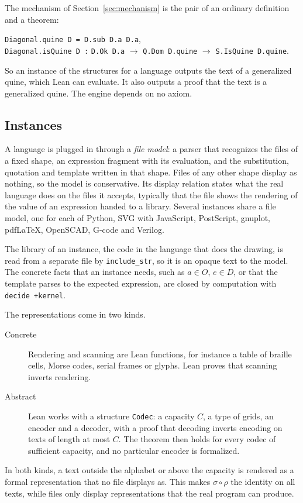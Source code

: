 \documentclass[11pt]{amsart}
\theoremstyle{definition}
\theoremstyle{remark}
\newcommand{\rend}{\rho}
\newcommand{\scan}{\sigma}
\newcommand{\lean}[1]{\texttt{#1}}
\begin{document}
The mechanism of Section~\ref{sec:mechanism} is the pair of an ordinary definition and a theorem:
\begin{center}\small
\lean{Diagonal.quine D = D.sub D.a D.a},\\
\lean{Diagonal.isQuine D :} \lean{D.Ok D.a} $\to$ \lean{Q.Dom D.quine} $\to$
\lean{S.IsQuine D.quine}.
\end{center}
So an instance of the structures for a language outputs the text of a generalized quine, which
Lean can evaluate. It also outputs a proof that the text is a generalized quine. The engine depends
on no axiom.

\subsection{Instances}

A language is plugged in through a \emph{file model}: a parser that recognizes the files of a fixed
shape, an expression fragment with its evaluation, and the substitution, quotation and template
written in that shape. Files of any other shape display as nothing, so the model is conservative.
Its display relation states what the real language does on the files it accepts, typically that the
file shows the rendering of the value of an expression handed to a library. Several instances share
a file model, one for each of Python, SVG with JavaScript, PostScript, gnuplot, pdf\LaTeX, OpenSCAD,
G-code and Verilog.

The library of an instance, the code in the language that does the drawing, is read from a separate
file by \lean{include\_str}, so it is an opaque text to the model. The concrete facts that an
instance needs, such as $a \in O$, $e \in D$, or that the template parses to the expected
expression, are closed by computation with \lean{decide +kernel}.

The representations come in two kinds.
\begin{description}
\item[Concrete] Rendering and scanning are Lean functions, for instance a table of braille cells,
Morse codes, serial frames or glyphs. Lean proves
that scanning inverts rendering.
\item[Abstract] Lean works with a structure \lean{Codec}: a capacity $C$, a type of grids, an
encoder and a decoder, with a proof that decoding inverts encoding on texts of length at most $C$.
The theorem then holds for every codec of sufficient capacity, and no particular encoder is
formalized.
\end{description}
In both kinds, a text outside the alphabet or above the capacity is rendered as a formal
representation that no file displays as. This makes $\scan \circ \rend$ the identity on all texts,
while files only display representations that the real program can produce.
\end{document}
